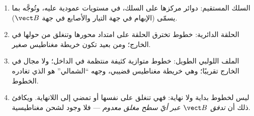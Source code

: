 \begin{proposition}\label{prop:b1:magnetostatics:maps}
\begin{enumerate}
  \item السلك المستقيم: دوائر مركزها على السلك، في مستويات
        عمودية عليه، وتُوجَّه بما يسمّى \emph{}
        (الإبهام في جهة التيار والأصابع في جهة $\vect B$).
  \item الحلقة الدائرية: خطوط تخترق الحلقة على امتداد محورها وتنغلق
        من حولها في الخارج؛ ومن بعيد تكون خريطة مغناطيس صغير.
  \item الملف اللولبي الطويل: خطوط متوازية كثيفة منتظمة في الداخل؛ ولا
        مجال في الخارج تقريبًا؛ وهي خريطة مغناطيس قضيبي، وجهه
        ``الشمالي'' هو الذي تغادره الخطوط.
  \item ليس لخطوط  بداية ولا نهاية: فهي تنغلق
        على نفسها أو تمضي إلى اللانهاية. ويكافئ ذلك أن \emph{تدفق
        $\vect B$ عبر أيّ سطح مغلق معدوم} --- فلا وجود لشحن
        مغناطيسية.
\end{enumerate}
\end{proposition}
\admitted

